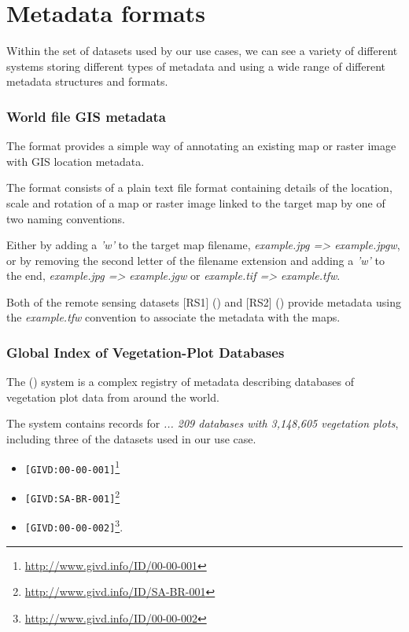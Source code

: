 \documentclass{article}
\begin{document}
\section{Metadata formats}

Within the set of datasets used by our use cases, we can see a variety of
different systems storing different types of metadata and using a wide
range of different metadata structures and formats.

\subsubsection{World file GIS metadata}

The  format provides a simple way of
annotating an existing map or raster image with GIS location metadata.

The \cite{format-world} format consists of a plain text file format containing
details of the location, scale and rotation of a map or raster image
linked to the target map by one of two naming conventions.

Either by adding a \textit{'w'} to the target map filename, \textit{example.jpg => example.jpgw},
or by removing the second letter of the filename extension and adding a \textit{'w'} to the end,
\textit{example.jpg => example.jgw} or \textit{example.tif => example.tfw}.

Both of the remote sensing datasets
[RS1] (\cite{saatchi-2011})
and
[RS2] (\cite{baccini-2012})
provide
\cite{format-world}
metadata 
using the \textit{example.tfw} convention to associate the metadata
with the \cite{format-geotiff} maps.

\subsubsection{Global Index of Vegetation-Plot Databases}

The  (\cite{gvid}) system is a complex registry of metadata describing
databases of vegetation plot data from around the world.

The \cite{gvid} system contains records for
\textit{ ... 209 databases with 3,148,605 vegetation plots},
including three of the datasets used in our use case.

\begin{itemize}
\item \cite{forest-plots} \texttt{[GIVD:00-00-001]}\footnote{\url{http://www.givd.info/ID/00-00-001}}
\item \cite{ppbio} \texttt{[GIVD:SA-BR-001]}\footnote{\url{http://www.givd.info/ID/SA-BR-001}}
\item \cite{team}  \texttt{[GIVD:00-00-002]}\footnote{\url{http://www.givd.info/ID/00-00-002}}.
\end{itemize}
\end{document}
